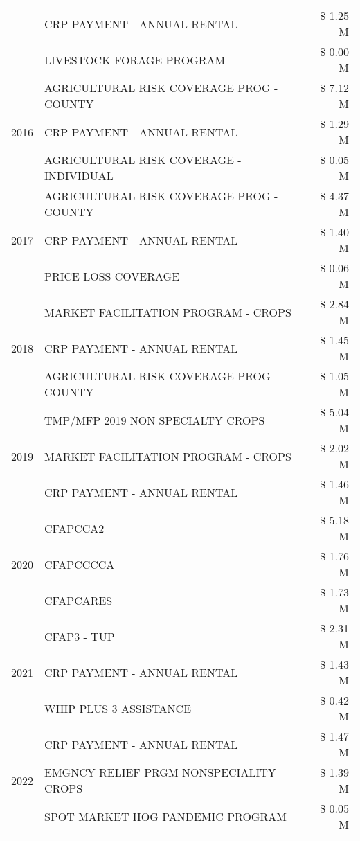 \begin{tabular}{llr}
 & CRP PAYMENT - ANNUAL RENTAL & \$ 1.25 M \\
 & LIVESTOCK FORAGE PROGRAM & \$ 0.00 M \\
\cline{1-3}
\multirow[t]{3}{*}{2016} & AGRICULTURAL RISK COVERAGE PROG - COUNTY & \$ 7.12 M \\
 & CRP PAYMENT - ANNUAL RENTAL & \$ 1.29 M \\
 & AGRICULTURAL RISK COVERAGE - INDIVIDUAL & \$ 0.05 M \\
\cline{1-3}
\multirow[t]{3}{*}{2017} & AGRICULTURAL RISK COVERAGE PROG - COUNTY & \$ 4.37 M \\
 & CRP PAYMENT - ANNUAL RENTAL & \$ 1.40 M \\
 & PRICE LOSS COVERAGE & \$ 0.06 M \\
\cline{1-3}
\multirow[t]{3}{*}{2018} & MARKET FACILITATION PROGRAM - CROPS & \$ 2.84 M \\
 & CRP PAYMENT - ANNUAL RENTAL & \$ 1.45 M \\
 & AGRICULTURAL RISK COVERAGE PROG - COUNTY & \$ 1.05 M \\
\cline{1-3}
\multirow[t]{3}{*}{2019} & TMP/MFP 2019 NON SPECIALTY CROPS & \$ 5.04 M \\
 & MARKET FACILITATION PROGRAM - CROPS & \$ 2.02 M \\
 & CRP PAYMENT - ANNUAL RENTAL & \$ 1.46 M \\
\cline{1-3}
\multirow[t]{3}{*}{2020} & CFAPCCA2 & \$ 5.18 M \\
 & CFAPCCCCA & \$ 1.76 M \\
 & CFAPCARES & \$ 1.73 M \\
\cline{1-3}
\multirow[t]{3}{*}{2021} & CFAP3 - TUP & \$ 2.31 M \\
 & CRP PAYMENT - ANNUAL RENTAL & \$ 1.43 M \\
 & WHIP PLUS 3 ASSISTANCE & \$ 0.42 M \\
\cline{1-3}
\multirow[t]{3}{*}{2022} & CRP PAYMENT - ANNUAL RENTAL & \$ 1.47 M \\
 & EMGNCY RELIEF PRGM-NONSPECIALITY CROPS & \$ 1.39 M \\
 & SPOT MARKET HOG PANDEMIC PROGRAM & \$ 0.05 M \\
\cline{1-3}
\bottomrule
\end{tabular}
